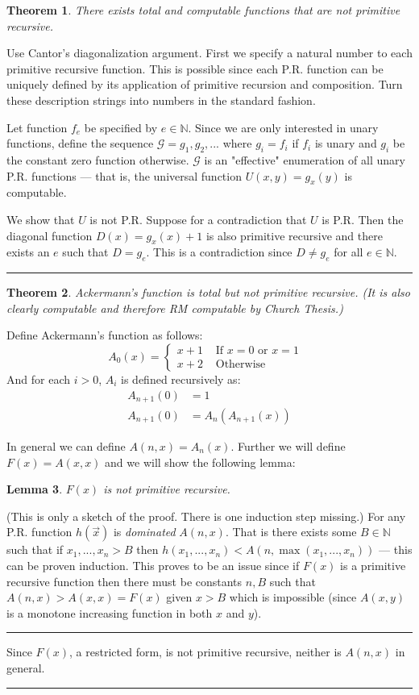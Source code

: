 \documentclass[twoside]{article}
\newcounter{lecnum}
\newtheorem{theorem}{Theorem}[lecnum]
\newtheorem{lemma}[theorem]{Lemma}
\newenvironment{proof}{{\bf Proof:}}{\hfill\rule{2mm}{2mm}}
\def\N{\mathbb{N}}
\begin{document}
\begin{theorem}
There exists total and computable functions that are not primitive recursive.
\end{theorem}
\begin{proof}
Use Cantor's diagonalization argument. First we specify a natural number to each primitive recursive function. This is possible since each P.R. function can be uniquely defined by its application of primitive recursion and composition. Turn these description strings into numbers in the standard fashion. 

Let function $f_e$ be specified by $e \in \N$. Since we are only interested in unary functions, define the sequence $\mathcal{G} = g_1, g_2, ...$ where $g_i = f_i$ if $f_i$ is unary and $g_i$ be the constant zero function otherwise. $\mathcal{G}$ is an "effective" enumeration of all unary P.R. functions --- that is, the universal function $U(x,y) = g_x(y)$ is computable.

We show that $U$ is not P.R. Suppose for a contradiction that $U$ is P.R. Then the diagonal function $D(x) = g_x(x) + 1$ is also primitive recursive and there exists an $e$ such that $D = g_e$. This is a contradiction since $D \neq g_e$ for all $e \in \N$.
\end{proof}

\begin{theorem}
Ackermann's function is total but not primitive recursive. (It is also clearly computable and therefore RM computable by Church Thesis.)
\end{theorem}
\begin{proof}
Define Ackermann's function as follows: 
\[A_0(x) = \begin{cases} 
x + 1 &\mbox{ If $x = 0$ or $x=1$ } \\
x + 2 &\mbox{ Otherwise }
\end{cases}\]
And for each $i > 0$, $A_i$ is defined recursively as:
\begin{align*}
A_{n+1}(0) &= 1 \\
A_{n+1}(0) &= A_n(A_{n+1}(x))
\end{align*}

In general we can define $A(n,x) = A_{n}(x)$. Further we will define $F(x) = A(x, x)$ and we will show the following lemma:
\begin{lemma} 
$F(x)$ is not primitive recursive.
\end{lemma}
\begin{proof}
(This is only a sketch of the proof. There is one induction step missing.) For any P.R. function $h(\vec{x})$ is \emph{dominated} $A(n,x)$. That is there exists some $B \in \N$ such that if $x_1, ..., x_n > B$ then $h(x_1, ..., x_n) < A(n, \max (x_1, ..., x_n))$ --- this can be proven induction. This proves to be an issue since if $F(x)$ is a primitive recursive function then there must be constants $n, B$ such that $A(n, x) > A(x, x) = F(x)$ given $x > B$ which is impossible (since $A(x,y)$ is a monotone increasing function in both $x$ and $y$).  
\end{proof}

Since $F(x)$, a restricted form, is not primitive recursive, neither is $A(n,x)$ in general.
\end{proof}
\end{document}
